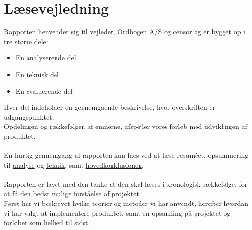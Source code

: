 \section{Læsevejledning}
Rapporten henvender sig til vejleder, Ordbogen A/S og censor og er bygget op i tre større dele:
\begin{itemize}
    \item{En analyserende del}
    \item{En teknisk del}
    \item{En evaluerende del}
\end{itemize}
Hver del indeholder en gennemgående beskrivelse, hvor overskriften er udgangspunktet. 
\\
Opdelingen og rækkefølgen af emnerne, afspejler vores forløb med udviklingen af produktet.
\\\\
En hurtig gennemgang af rapporten kan fåes ved at læse resuméet, opsummering til \hyperlink{delkonklusion-analyse}{analyse} og \hyperlink{teknik}{teknik}, samt \hyperlink{konklusion}{hovedkonklusionen}.
\\\\
Rapporten er lavet med den tanke at den skal læses i kronologisk rækkefølge, for at få den bedst mulige forståelse af projektet.\\
Først har vi beskrevet hvilke teorier og metoder vi har anvendt, herefter hvordan vi har valgt at implementere produktet,
samt en opsamling på projektet og forløbet som helhed til sidst.

